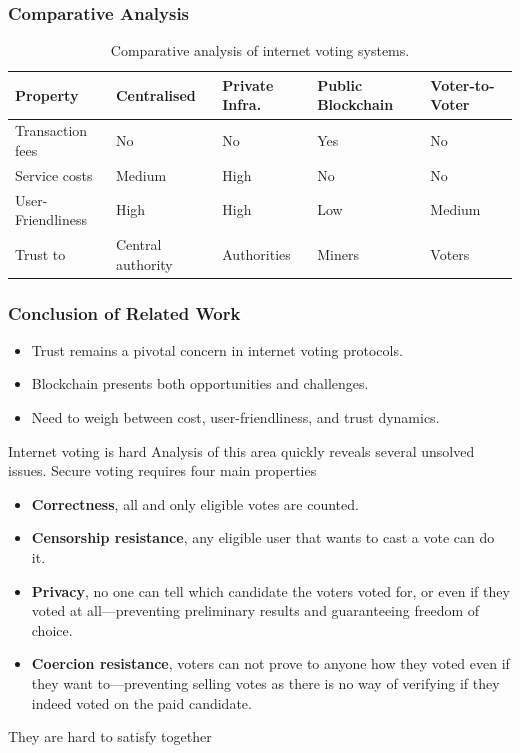 \documentclass{beamer}
\begin{document}
\begin{frame}
	\frametitle{Comparative Analysis}
	\begin{table}
	\centering
	\newcommand{\YES}{\cellcolor{red!50}Yes}
	\newcommand{\NO}{\cellcolor{green!50}No}
	\caption{Comparative analysis of internet voting systems.}
	\begin{tabular}{|l|l|l|l|l|}
	\hline
	\textbf{Property} & \textbf{Centralised} & \textbf{Private Infra.} & \textbf{Public Blockchain} & \textbf{Voter-to-Voter} \\
	\hline
	Transaction fees & \NO & \NO & \YES & \NO \\
	\hline
	Service costs & Medium & High & No  & No \\
	\hline
	User-Friendliness & High & High & Low & Medium \\
	\hline
	Trust to & Central authority & Authorities & Miners & Voters  \\
	\hline
	\end{tabular}
	\end{table}
\end{frame}

\begin{frame}
	\frametitle{Conclusion of Related Work}
	\begin{itemize}
		\item Trust remains a pivotal concern in internet voting protocols.
		\item Blockchain presents both opportunities and challenges.
		\item Need to weigh between cost, user-friendliness, and trust dynamics.
	\end{itemize}
\end{frame}

\begin{frame}{Internet voting is hard}
	Analysis of this area quickly reveals several unsolved issues.
	Secure voting requires four main properties

	\begin{itemize}
	\item<1-> \textbf{Correctness}, all and only eligible votes are counted.
	\item<2-> \textbf{Censorship resistance}, any eligible user that wants to cast a vote can do it.
	\item<3-> \textbf{Privacy}, no one can tell which candidate the voters voted for, or even if they voted at all—preventing preliminary results and guaranteeing freedom of choice.
	\item<4-> \textbf{Coercion resistance}, voters can not prove to anyone how they voted even if they want to—preventing selling votes as there is no way of verifying if they indeed voted on the paid candidate.
	\end{itemize}

	\pause
	They are hard to satisfy together
\end{frame}
\end{document}
